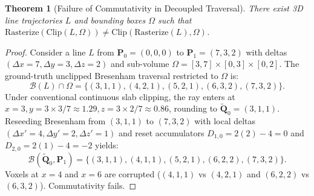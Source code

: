 \documentclass[journal=dme,manuscript=article,11pt]{article}
\newtheorem{theorem}{Theorem}
\begin{document}
\begin{theorem}[Failure of Commutativity in Decoupled Traversal]
\label{thm:counterexample}
There exist 3D line trajectories $L$ and bounding boxes $\Omega$ such that $\mathrm{Rasterize}(\mathrm{Clip}(L, \Omega)) \ne \mathrm{Clip}(\mathrm{Rasterize}(L), \Omega)$.
\end{theorem}

\begin{proof}
Consider a line $L$ from $\mathbf{P}_0 = (0,0,0)$ to $\mathbf{P}_1 = (7,3,2)$ with deltas $(\Delta x = 7, \Delta y = 3, \Delta z = 2)$ and sub-volume $\Omega = [3, 7] \times [0, 3] \times [0, 2]$. 
The ground-truth unclipped Bresenham traversal restricted to $\Omega$ is:
$$\mathcal{B}(L) \cap \Omega = \{(3, 1, 1), (4, 2, 1), (5, 2, 1), (6, 3, 2), (7, 3, 2)\}.$$
Under conventional continuous slab clipping, the ray enters at $x = 3, y = 3 \times 3/7 \approx 1.29, z = 3 \times 2/7 \approx 0.86$, rounding to $\tilde{\mathbf{Q}}_0 = (3, 1, 1)$. Reseeding Bresenham from $(3, 1, 1)$ to $(7, 3, 2)$ with local deltas $(\Delta x' = 4, \Delta y' = 2, \Delta z' = 1)$ and reset accumulators $D_{1,0} = 2(2) - 4 = 0$ and $D_{2,0} = 2(1) - 4 = -2$ yields:
$$\mathcal{B}(\tilde{\mathbf{Q}}_0, \mathbf{P}_1) = \{(3, 1, 1), (4, 1, 1), (5, 2, 1), (6, 2, 2), (7, 3, 2)\}.$$
Voxels at $x = 4$ and $x = 6$ are corrupted ($(4, 1, 1)$ vs $(4, 2, 1)$ and $(6, 2, 2)$ vs $(6, 3, 2)$). Commutativity fails.
\end{proof}
\end{document}
